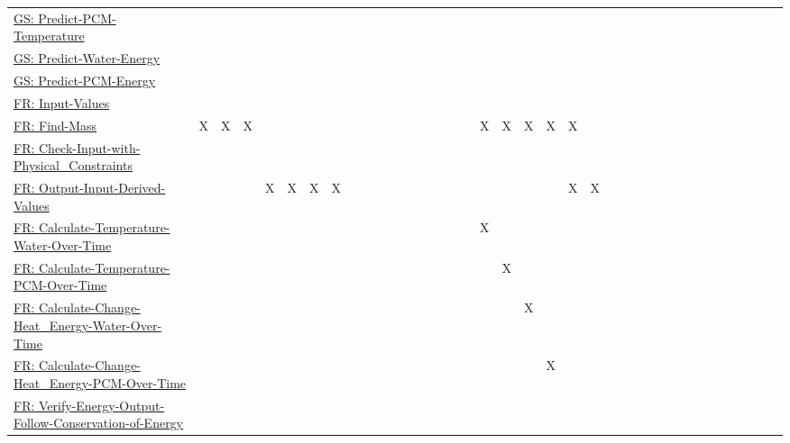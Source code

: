 \documentclass[12pt]{article}
\begin{document}
\begin{longtable}{l l l l l l l l l l l l l l l l l l l l l l l l l l l l l l l l l l l l l l}
\\
\hyperref[pcmTempGS]{GS: Predict-PCM-Temperature} &  &  &  &  &  &  &  &  &  &  &  &  &  &  &  &  &  &  &  &  &  &  &  &  &  &  &  &  &  &  &  &  &  &  &  &  & 
\\
\hyperref[waterEnergyGS]{GS: Predict-Water-Energy} &  &  &  &  &  &  &  &  &  &  &  &  &  &  &  &  &  &  &  &  &  &  &  &  &  &  &  &  &  &  &  &  &  &  &  &  & 
\\
\hyperref[pcmEnergyGS]{GS: Predict-PCM-Energy} &  &  &  &  &  &  &  &  &  &  &  &  &  &  &  &  &  &  &  &  &  &  &  &  &  &  &  &  &  &  &  &  &  &  &  &  & 
\\
\hyperref[inputValues]{FR: Input-Values} &  &  &  &  &  &  &  &  &  &  &  &  &  &  &  &  &  &  &  &  &  &  &  &  &  &  &  &  &  &  &  &  &  &  &  &  & 
\\
\hyperref[findMass]{FR: Find-Mass} & X & X & X &  &  &  &  &  &  &  &  &  &  &  &  &  &  & X & X & X & X & X &  &  &  &  &  &  &  &  &  &  &  &  &  &  & 
\\
\hyperref[checkWithPhysConsts]{FR: Check-Input-with-Physical\_Constraints} &  &  &  &  &  &  &  &  &  &  &  &  &  &  &  &  &  &  &  &  &  &  &  &  &  &  &  &  &  &  &  &  &  &  &  &  & 
\\
\hyperref[outputInputDerivVals]{FR: Output-Input-Derived-Values} &  &  &  & X & X & X & X &  &  &  &  &  &  &  &  &  &  &  &  &  &  & X & X &  &  &  &  &  &  &  &  &  &  &  &  &  & 
\\
\hyperref[calcTempWtrOverTime]{FR: Calculate-Temperature-Water-Over-Time} &  &  &  &  &  &  &  &  &  &  &  &  &  &  &  &  &  & X &  &  &  &  &  &  &  &  &  &  &  &  &  &  &  &  &  &  & 
\\
\hyperref[calcTempPCMOverTime]{FR: Calculate-Temperature-PCM-Over-Time} &  &  &  &  &  &  &  &  &  &  &  &  &  &  &  &  &  &  & X &  &  &  &  &  &  &  &  &  &  &  &  &  &  &  &  &  & 
\\
\hyperref[calcChgHeatEnergyWtrOverTime]{FR: Calculate-Change-Heat\_Energy-Water-Over-Time} &  &  &  &  &  &  &  &  &  &  &  &  &  &  &  &  &  &  &  & X &  &  &  &  &  &  &  &  &  &  &  &  &  &  &  &  & 
\\
\hyperref[calcChgHeatEnergyPCMOverTime]{FR: Calculate-Change-Heat\_Energy-PCM-Over-Time} &  &  &  &  &  &  &  &  &  &  &  &  &  &  &  &  &  &  &  &  & X &  &  &  &  &  &  &  &  &  &  &  &  &  &  &  & 
\\
\hyperref[verifyEnergyOutput]{FR: Verify-Energy-Output-Follow-Conservation-of-Energy} &  &  &  &  &  &  &  &  &  &  &  &  &  &  &  &  &  &  &  &  &  &  &  &  &  &  &  &  &  &  &  &  &  &  &  &  & 

\end{longtable}
\end{document}
